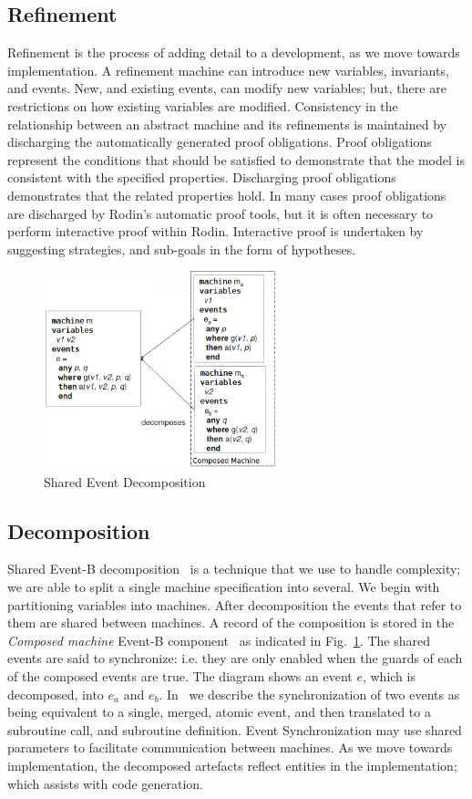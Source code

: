 \documentclass{llncs}%
\begin{document}
\subsection{Refinement}
Refinement is the process of adding detail to a development, as we move towards implementation. A refinement machine can introduce new variables, invariants, and events. New, and existing events, can modify new variables; but, there are restrictions on how existing variables are modified. Consistency in the relationship between an abstract machine and its refinements is maintained by discharging the automatically generated proof obligations. Proof obligations represent the conditions that should be satisfied to demonstrate that the model is consistent with the specified properties. Discharging proof obligations demonstrates that the related properties hold. In many cases proof obligations are discharged by Rodin's automatic proof tools, but it is often necessary to perform interactive proof within Rodin. Interactive proof is undertaken by suggesting strategies, and sub-goals in the form of hypotheses. 

\begin{figure}
\centering
\includegraphics[width=0.6\textwidth]{Decomp2.png}
\caption{Shared Event Decomposition}
\label{fig:Decomp2}
\end{figure}

\subsection{Decomposition}\label{decomp}
Shared Event-B decomposition~\cite{Butler09a,decomp2010b} is a technique that we use to handle complexity; we are able to split a single machine specification into several. We begin with partitioning variables into machines. After decomposition the events that refer to them are shared between machines. A record of the composition is stored in the \emph{Composed machine} Event-B component~\cite{decomp2010c} as indicated in Fig.~\ref{fig:Decomp2}.  The shared events are said to synchronize: i.e. they are only enabled when the guards of each of the composed events are true.  The diagram shows an event $e$, which is decomposed, into $e_a$ and $e_b$.
%
%
%
In~\cite{ae2011a} we describe the synchronization of two events as being equivalent to a single, merged, atomic event, and then translated to a subroutine call, and subroutine definition. Event Synchronization may use shared parameters to facilitate communication between machines.   As we move towards implementation, the decomposed artefacts reflect entities in the implementation; which assists with code generation.
\end{document}

